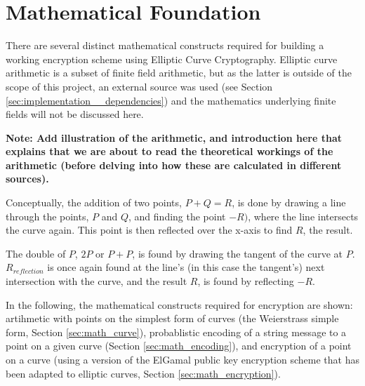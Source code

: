 \section{Mathematical Foundation}

There are several distinct mathematical constructs required for building a working encryption scheme using Elliptic
Curve Cryptography. Elliptic curve arithmetic is a subset of finite field arithmetic, but as the latter is outside
of the scope of this project, an external source was used (see Section \ref{sec:implementation__dependencies}) and
the mathematics underlying finite fields will not be discussed here.

\textbf{Note: Add illustration of the arithmetic, and introduction here that explains that we are about to read
the theoretical workings of the arithmetic (before delving into how these are calculated in different
sources).}

Conceptually, the addition of two points, \(P + Q = R\), is done by drawing a line through the points, \(P\) and \(Q\),
and finding the point \(-R)\), where the line intersects the curve again. This point is
then reflected over the x-axis to find \(R\), the result.

The double of \(P\), \(2P\) or \(P+P\), is found by drawing the tangent of the curve at \(P\).
\(R_{reflection}\) is once again found at the line's (in this case the tangent's) next intersection
with the curve, and the result \(R\), is found by reflecting \(-R\).\cite{hankerson2010}

In the following, the mathematical constructs required for encryption are shown: artihmetic with points on the simplest
form of curves (the Weierstrass simple form, Section \ref{sec:math_curve}), probablistic encoding of a string message
to a point on a given curve (Section \ref{sec:math_encoding}), and encryption of a point on a curve (using a version
of the ElGamal public key encryption scheme that has been adapted to elliptic curves, Section \ref{sec:math_encryption}).



